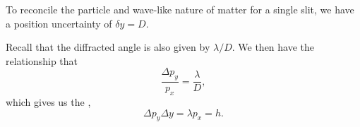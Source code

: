 \documentclass{article}
\numberwithin{equation}{section}
\begin{document}
To reconcile the particle and wave-like nature of matter for a single slit, we have a position uncertainty of $\delta y = D.$
\begin{center}
\end{center}
Recall that the diffracted angle is also given by $\lambda/D.$ We then have the relationship that 
\begin{equation*}
    \frac{\Delta p_y}{p_x} = \frac{\lambda}{D},
\end{equation*}
which gives us the ,
\begin{equation*}
    \Delta p_y \Delta y = \lambda p_x = h.
\end{equation*}
\end{document}
